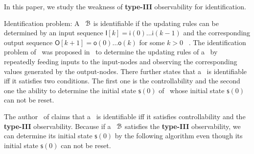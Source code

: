 In this paper, we study the weakness of {\bf type-III} observability for identification.

Identification problem: A \BCN\ ${\mathcal{B}}$ is identifiable if the updating rules can be determined by an input sequence $\mathsf{I}[k]=\mathsf{i}(0)\ldots\mathsf{i}(k-1)$ and the corresponding output sequence $\mathsf{O}[k+1]=\mathsf{o}(0)\ldots\mathsf{o}(k)$ for some $k>0$~ \cite{Cheng2011Identification}. The identification problem of \BCNs\ was proposed in~\cite{Cheng2011Identification} to determine the updating rules of a \BCN\ by repeatedly feeding inputs to the input-nodes and observing the corresponding values generated by the output-nodes. 
There further states that a \BCN\ is identifiable iff it satisfies two conditions. The first one is the controllability and the second one  the ability to determine the initial state $\mathsf{s}(0)$ of \BCN\ whose initial state $\mathsf{s}(0)$ can not be reset. %

The author~\cite{Cheng2011Identification} of claims that a \BCN\ is identifiable iff it satisfies controllability and the {\bf type-III} observability. Because if a \BCN\ ${\mathcal{B}}$ satisfies the {\bf type-III} observability, we can determine its initial state $\mathsf{s}(0)$ by the following algorithm even though its initial state $\mathsf{s}(0)$ can not be reset.




 
 


